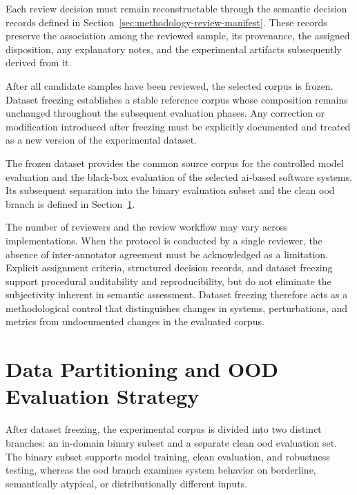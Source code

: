 Each review decision must remain reconstructable through the semantic decision
records defined in Section~\ref{sec:methodology-review-manifest}. These records
preserve the association among the reviewed sample, its provenance, the
assigned disposition, any explanatory notes, and the experimental artifacts
subsequently derived from it.

After all candidate samples have been reviewed, the selected corpus is frozen.
Dataset freezing establishes a stable reference corpus whose composition
remains unchanged throughout the subsequent evaluation phases. Any correction
or modification introduced after freezing must be explicitly documented and
treated as a new version of the experimental dataset.

The frozen dataset provides the common source corpus for the controlled
model evaluation and the black-box evaluation of the selected
\gls{ai}-based software systems. Its subsequent separation into the binary
evaluation subset and the clean \gls{ood} branch is defined in
Section~\ref{sec:methodology-split-generation}.

The number of reviewers and the review workflow may vary across
implementations. When the protocol is conducted by a single reviewer, the
absence of inter-annotator agreement must be acknowledged as a limitation.
Explicit assignment criteria, structured decision records, and dataset
freezing support procedural auditability and reproducibility, but do not
eliminate the subjectivity inherent in semantic assessment. Dataset freezing
therefore acts as a methodological control that distinguishes changes in
systems, perturbations, and metrics from undocumented changes in the evaluated
corpus.











\section{Data Partitioning and OOD Evaluation Strategy}
\label{sec:methodology-split-generation}

After dataset freezing, the experimental corpus is divided into two distinct
branches: an in-domain binary subset and a separate clean \gls{ood} evaluation
set. The binary subset supports model training, clean evaluation, and
robustness testing, whereas the \gls{ood} branch examines system behavior on
borderline, semantically atypical, or distributionally different inputs.

